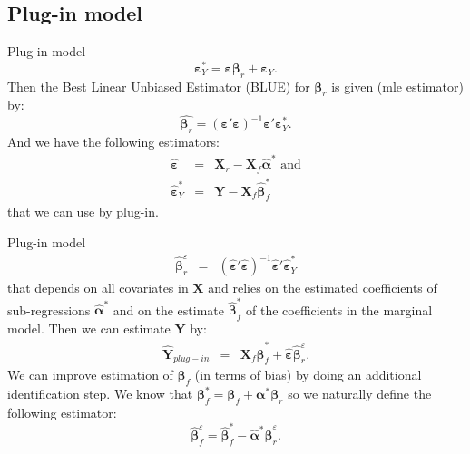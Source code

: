 \documentclass[11pt]{beamer}
\begin{document}
	\subsection{Plug-in model}
		\begin{frame}{Plug-in model}
\begin{equation}
	\boldsymbol{\varepsilon}_Y^*%
	=\boldsymbol{\varepsilon}\boldsymbol{\beta}_r+\boldsymbol{\varepsilon}_Y. \label{eq:regplugin} 
\end{equation}
Then the Best Linear Unbiased Estimator ({\sc BLUE}) for $\boldsymbol{\beta}_r$ is given ({\sc mle} estimator) by:
\begin{equation}
  \hat{\boldsymbol{\beta}_r}=(\boldsymbol{\varepsilon}'\boldsymbol{\varepsilon})^{-1}\boldsymbol{\varepsilon}'\boldsymbol{\varepsilon}_Y^* . \label{olsplugin}
\end{equation}
    And we have the following estimators:
	\begin{eqnarray}
		\hat{\boldsymbol{\varepsilon}}&=& \boldsymbol{X}_r-\boldsymbol{X}_f\hat{\boldsymbol{\alpha}}^* \nonumber \textrm{ and} \\
		\hat{\boldsymbol{\varepsilon}}_Y^*&=&\boldsymbol{Y}-\boldsymbol{X}_f\hat{\boldsymbol{\beta}}_f^* \nonumber
	\end{eqnarray}
	that we can use by plug-in.
	\end{frame}
	\begin{frame}{Plug-in model}
	\begin{eqnarray}
		\hat{\boldsymbol{\beta}}_r^{\varepsilon}&=&(\hat{\boldsymbol{\varepsilon}}'\hat{\boldsymbol{\varepsilon}})^{-1}\hat{\boldsymbol{\varepsilon}}'\hat{\boldsymbol{\varepsilon}}_Y^*  \nonumber 
	\end{eqnarray}
that depends on all covariates in $\boldsymbol{X}$ and relies on the estimated coefficients of sub-regressions $\hat{\boldsymbol{\alpha}}^*$ and on the estimate $\hat{\boldsymbol{\beta}}_f^*$ of the coefficients in the marginal model.
Then we can estimate $\boldsymbol{Y}$ by:
\begin{eqnarray}
	\hat{\boldsymbol{Y}}_{plug-in}&=&\boldsymbol{X}_f\hat{\boldsymbol{\beta}}^*_f + \hat{\boldsymbol{\varepsilon}}\hat{\boldsymbol{\beta}}_{r}^{\varepsilon}. \label{hatYplugin} 
\end{eqnarray}
We can improve estimation of $\boldsymbol{\beta}_f$ (in terms of bias) by doing an additional identification step.	We know that $\boldsymbol{\beta}^*_f=\boldsymbol{\beta}_f+\boldsymbol{\alpha}^*\boldsymbol{\beta}_r $ so we naturally define the following estimator:
			\begin{equation}
			\hat{\boldsymbol{\beta}}_f^{\varepsilon}=\hat{\boldsymbol{\beta}}^*_f-\hat{\boldsymbol{\alpha}}^*\hat{\boldsymbol{\beta}}_{r}^{\varepsilon}. \nonumber 
			\end{equation}
		\end{frame}
		
\end{document}
